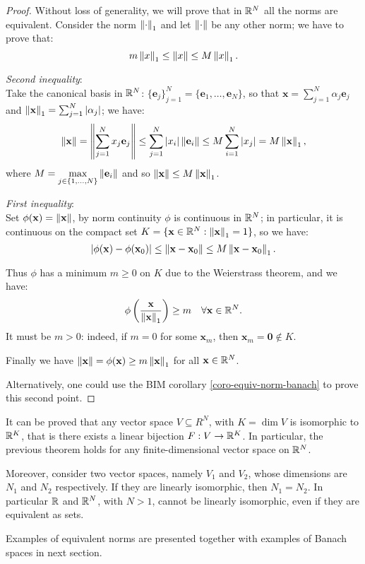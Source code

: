 \begin{proof}
	Without loss of generality, we will prove that in $\mathbb R^N$ all the norms are equivalent. 
	Consider the norm $\left\lVert\cdot\right\rVert_1$ and let $\left\lVert\cdot\right\rVert$ be any other norm; we have to prove that:
	$$
	m \left\lVert x\right\rVert_1 
	\leq \left\lVert x\right\rVert \leq M \left\lVert x\right\rVert_1
	.
	$$
	
	\textit{Second inequality}:\\
	Take the canonical basis in $\mathbb R^N$: $\{\mathbf e_j\}^N_{j=1} = \{\mathbf e_1,\ldots, \mathbf e_N\}$, so that $\mathbf x=\sum_{j=1}^N \alpha_j \mathbf e_j$ and $\left\lVert\mathbf x\right\rVert_1 = \sum^N_{j=1}|\alpha_j|$; we have:
	$$
	\left\lVert\mathbf x\right\rVert
	=\left\lVert\sum_{j=1}^{N}x_j \mathbf e_j\right\rVert 
	\leq \sum_{j=1}^{N} |x_i|\left\lVert\mathbf e_i\right\rVert 
	\leq M \sum_{i=1}^N|x_j| 
	= M \left\lVert\mathbf x\right\rVert_1
	,
	$$
	where $M= \max\limits_{j\in\{1,\ldots,N\}}\left\lVert\mathbf e_i\right\rVert$ and so $\left\lVert\mathbf x\right\rVert \leq M \left\lVert\mathbf x\right\rVert_1$.
	
	\textit{First inequality}:\\
	Set $\phi(\mathbf x) = \left\lVert\mathbf x\right\rVert$, by norm continuity $\phi$ is continuous in $\mathbb R^N$; in particular, it is continuous on the compact set $K = \{\mathbf x \in \mathbb R^N : \left\lVert\mathbf x\right\rVert_1 = 1\}$, so we have:
	$$ 
	\left\lvert \phi(\mathbf x) - \phi(\mathbf x_0) \right\rvert 
	\leq \left\lVert\mathbf x - \mathbf x_0\right\rVert 
	\leq M \left\lVert\mathbf x - \mathbf x_0\right\rVert_1
	.
	$$
	
	Thus $\phi$ has a minimum $m\geq 0$ on $K$ due to the Weierstrass theorem, and we have:
	$$
	\phi\left(\frac{\mathbf x}{\left\lVert\mathbf x\right\rVert_1}\right) 
	\geq m \quad 
	\forall \mathbf x \in \mathbb R^N
	.
	$$
	It must be $m>0$: indeed, if $m=0$ for some $\mathbf x_m$, then $\mathbf x_m = \mathbf 0 \notin K$.
	
	Finally we have $\left\lVert\mathbf x\right\rVert = \phi(\mathbf x) \geq m \left\lVert\mathbf x\right\rVert_1$ for all $\mathbf x \in \mathbb R^N$.

	Alternatively, one could use the BIM corollary \vref{coro-equiv-norm-banach} to prove this second point.
\end{proof}

It can be proved that any vector space $V \subseteq R^N$, with $K = \dim V$ is isomorphic to $\mathbb R^K$, that is there exists a linear bijection $F: V\to \mathbb R^K$.
In particular, the previous theorem holds for any finite-dimensional vector space on $\mathbb R^N$.

Moreover, consider two vector spaces, namely $V_1$ and $V_2$, whose dimensions are $N_1$ and $N_2$ respectively. If they are linearly isomorphic, then $N_1=N_2$. In particular $\mathbb R$ and $\mathbb R^N$, with $N>1$, cannot be linearly isomorphic, even if they are equivalent as sets. 

Examples of equivalent norms are presented together with examples of Banach spaces in next section.
